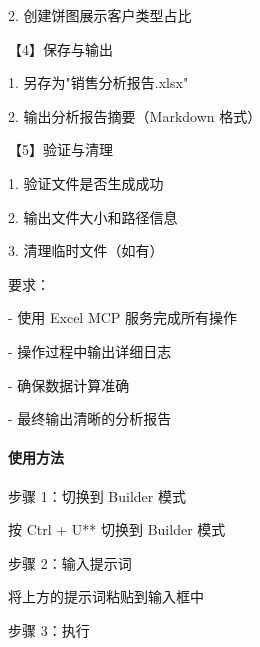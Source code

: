 \documentclass[
  american,
  chinese,
]{ctexart}
\begin{document}
\foreignlanguage{american}{2. }{{创建饼图展示}}{客户类型占比}\foreignlanguage{american}{}

{【}\foreignlanguage{american}{4}{】保存与输出}\foreignlanguage{american}{}

\foreignlanguage{american}{1. }{另存为}\foreignlanguage{american}{"}{销售分析报告}\foreignlanguage{american}{.xlsx"}

\foreignlanguage{american}{2. }{输出分析报告摘要（}\foreignlanguage{american}{Markdown }{格式）}\foreignlanguage{american}{}

{【}\foreignlanguage{american}{5}{】验证与清理}\foreignlanguage{american}{}

\foreignlanguage{american}{1. }{验证文件是否生成成功}\foreignlanguage{american}{}

\foreignlanguage{american}{2. }{输出文件大小和路径信息}\foreignlanguage{american}{}

\foreignlanguage{american}{3. }{清理临时文件（如有）}\foreignlanguage{american}{}

{要求：}\foreignlanguage{american}{}

\foreignlanguage{american}{- }{使用}\foreignlanguage{american}{ Excel MCP }{服务完成所有操作}\foreignlanguage{american}{}

\foreignlanguage{american}{- }{操作过程中输出详细日志}\foreignlanguage{american}{}

\foreignlanguage{american}{- }{确保数据计算准确}\foreignlanguage{american}{}

\foreignlanguage{american}{- }{最终输出清晰的分析报告}\foreignlanguage{american}{}

\paragraph{\texorpdfstring{{使用方法}\foreignlanguage{american}{}}{使用方法}}\label{ux4f7fux7528ux65b9ux6cd5}

{步骤}\foreignlanguage{american}{ 1}{：切换到}\foreignlanguage{american}{ Builder }{模式}\foreignlanguage{american}{}

{按}\foreignlanguage{american}{ Ctrl + U** }{切换到}\foreignlanguage{american}{ Builder }{模式}\foreignlanguage{american}{}

{步骤}\foreignlanguage{american}{ 2}{：输入提示词}\foreignlanguage{american}{}

{将上方的提示词粘贴到输入框中}\foreignlanguage{american}{}

{步骤}\foreignlanguage{american}{ 3}{：执行}\foreignlanguage{american}{}
\end{document}
